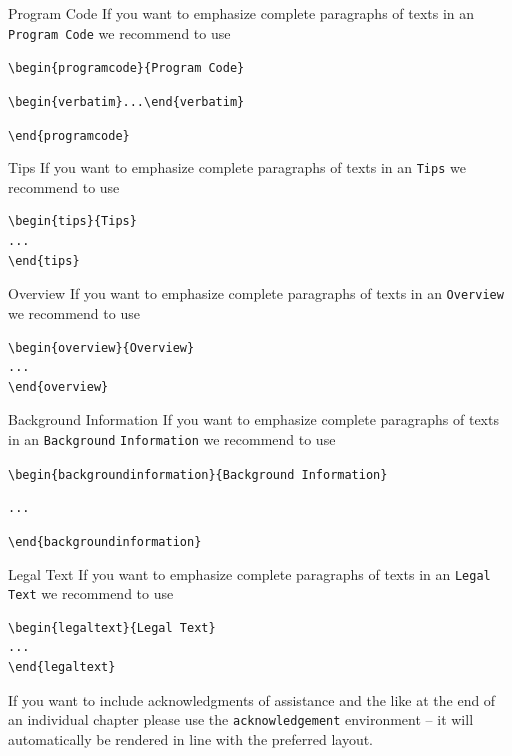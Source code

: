 \documentclass[graybox]{svmult}
\begin{document}
\begin{programcode}{Program Code}
If you want to emphasize complete paragraphs of texts in an \verb|Program Code| we recommend to
use

\verb|\begin{programcode}{Program Code}|

\verb|\begin{verbatim}...\end{verbatim}|

\verb|\end{programcode}|

\end{programcode}
%
\begin{tips}{Tips}
If you want to emphasize complete paragraphs of texts in an \verb|Tips| we recommend to
use  \begin{verbatim}\begin{tips}{Tips}
...
\end{tips}\end{verbatim}
\end{tips}
\eject
%
\begin{overview}{Overview}
If you want to emphasize complete paragraphs of texts in an \verb|Overview| we recommend to
use  \begin{verbatim}\begin{overview}{Overview}
...
\end{overview}\end{verbatim}

\end{overview}
\begin{backgroundinformation}{Background Information}
If you want to emphasize complete paragraphs of texts in an \verb|Background|
\verb|Information| we recommend to
use

\verb|\begin{backgroundinformation}{Background Information}|

\verb|...|

\verb|\end{backgroundinformation}|
\end{backgroundinformation}
\begin{legaltext}{Legal Text}
If you want to emphasize complete paragraphs of texts in an \verb|Legal Text| we recommend to
use  \begin{verbatim}\begin{legaltext}{Legal Text}
...
\end{legaltext}\end{verbatim}
\end{legaltext}
%
\begin{acknowledgement}
If you want to include acknowledgments of assistance and the like at the end of an individual chapter please use the \verb|acknowledgement| environment -- it will automatically be rendered in line with the preferred layout.
\end{acknowledgement}
%
\end{document}
